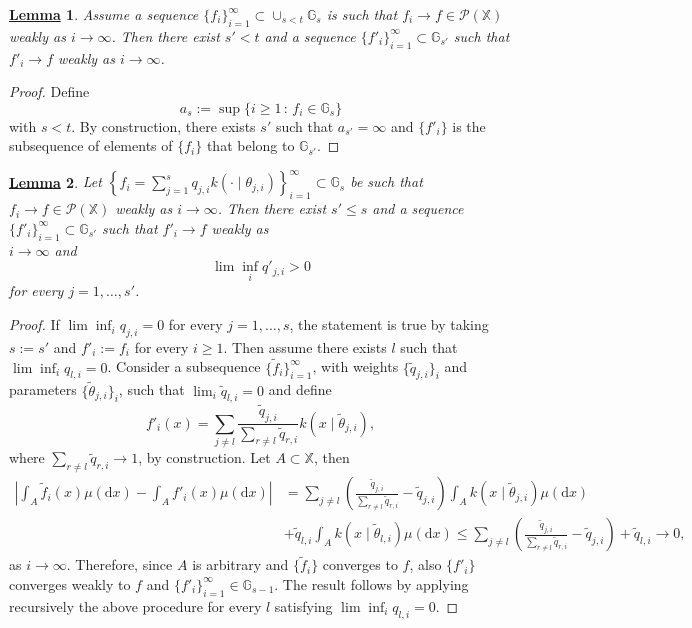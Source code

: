\documentclass[12pt]{article}
\newtheorem{Lem}{\underline{\bf Lemma}}
\def \d {\mathrm{d}}
\begin{document}
\begin{Lem}\label{first_auxiliary}
Assume a sequence $\{f_i\}_{i = 1}^\infty \subset \cup_{s < t}\mathbb{G}_s$ is such that $f_i \to f \in \mathcal{P}(\mathbb{X})$ weakly as $i \to \infty$. Then there exist $s' < t$ and a sequence $\{ f'_i\}_{i = 1}^\infty \subset \mathbb{G}_{s'}$ such that $f'_i \to f$ weakly as $i \to \infty$.
\end{Lem}
\begin{proof}
Define
\[
a_s := \sup \{i \geq 1 \, : \, f_i \in \mathbb{G}_s  \}
\]
with $ s < t$. By construction, there exists $s'$ such that $a_{s'} = \infty$ and $\{ f'_i\}$ is the subsequence of elements of $\{ f_i\}$ that belong to $\mathbb{G}_{s'}$.
\end{proof}
\begin{Lem}\label{second_auxiliary}
Let $\left\{ f_i = \sum_{j= 1}^s q_{j,i}k(\cdot \mid \theta_{j,i})\right\}_{i = 1}^\infty \subset \mathbb{G}_s$ be such that $f_i \to f \in \mathcal{P}(\mathbb{X})$ weakly as $i \to \infty$. Then there exist $s' \leq s$ and a sequence $\{ f'_i\}_{i = 1}^\infty \subset \mathbb{G}_{s'}$ such that $f'_i \to f$ weakly as \\$i \to \infty$ and
\[
\lim \inf_i q'_{j,i} > 0
\]
for every $j = 1, \dots, s'$.
\end{Lem}
\begin{proof}
If $\lim \inf_i q_{j,i} = 0$ for every $j = 1, \dots, s$, the statement is true by taking $s := s'$ and $f'_i := f_i$ for every $i \geq 1$. Then assume there exists $l$ such that $\lim \inf_i q_{l,i} = 0$. Consider a subsequence $\{ \tilde{f}_i\}_{i = 1}^\infty$, with weights $\{\tilde{q}_{j,i}\}_i$ and parameters $\{\tilde{\theta}_{j,i}\}_i$, such that $\lim_i \tilde{q}_{l,i} = 0$ and define
\[
f'_i(x) = \sum_{j \neq l} \frac{\tilde{q}_{j,i}}{\sum_{r \neq l}\tilde{q}_{r,i}}k(x \mid \tilde{\theta}_{j,i}),
\]
where $\sum_{r \neq l}\tilde{q}_{r,i} \to 1$, by construction. Let $A \subset \mathbb{X}$, then
\[
\begin{aligned}
\left \lvert \int_A\tilde{f}_i(x) \mu(\d x) - \int_Af'_i(x) \mu(\d x) \right \rvert &=  \sum_{j \neq l}\left(\frac{\tilde{q}_{j,i}}{\sum_{r \neq l}\tilde{q}_{r,i}}- \tilde{q}_{j,i}\right)\int_Ak(x \mid \tilde{\theta}_{j,i}) \mu(\d x) \\
&+\tilde{q}_{l,i}\int_Ak(x \mid \tilde{\theta}_{l,i}) \mu(\d x)\leq \sum_{j \neq l}\left(\frac{\tilde{q}_{j,i}}{\sum_{r \neq l}\tilde{q}_{r,i}}- \tilde{q}_{j,i}\right)+\tilde{q}_{l,i} \to 0,
\end{aligned}
\]
as $i \to \infty$. Therefore, since $A$ is arbitrary and $\{ \tilde{f}_i\}$ converges to $f$, also  $\{ f'_i\}$ converges weakly to $f$ and $\{ f'_i\}_{i = 1}^\infty \in \mathbb{G}_{s-1}$. The result follows by applying recursively the above procedure for every $l$ satisfying $\lim \inf_i q_{l,i} = 0$.
\end{proof}
\end{document}
